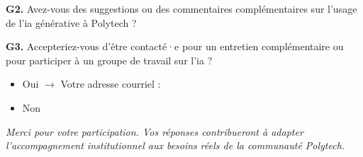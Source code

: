 \textbf{G2.} Avez-vous des suggestions ou des commentaires complémentaires sur l'usage de l'\gls{ia} générative à Polytech ?

\vspace{3cm}

\textbf{G3.} Accepteriez-vous d'être contacté·e pour un entretien complémentaire ou pour participer à un groupe de travail sur l'\gls{ia} ?
\begin{itemize}[label=$\square$, leftmargin=1.5cm]
  \item Oui $\rightarrow$ Votre adresse courriel : \underline{\hspace{5cm}}
  \item Non
\end{itemize}

\bigskip

\noindent\textit{Merci pour votre participation. Vos réponses contribueront à adapter l'accompagnement institutionnel aux besoins réels de la communauté Polytech.}
